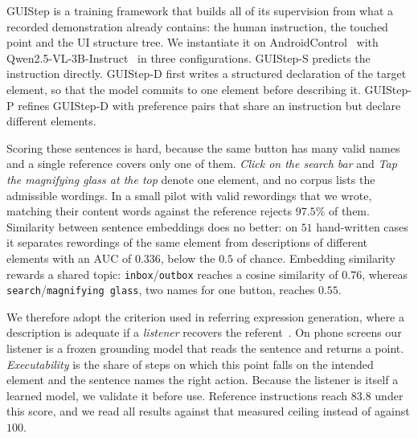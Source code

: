 \documentclass[runningheads,a4paper]{llncs}
\begin{document}
GUIStep is a training framework that builds all of its supervision from what a recorded
demonstration already contains: the human instruction, the touched point and the UI structure tree.
We instantiate it on AndroidControl~\cite{androidcontrol} with Qwen2.5-VL-3B-Instruct~\cite{qwen25vl} in three configurations. \mbox{GUIStep-S} predicts the instruction directly. \mbox{GUIStep-D} first writes a structured declaration of the target element, so that the model commits to one element before describing it. \mbox{GUIStep-P} refines \mbox{GUIStep-D} with preference pairs that share an instruction but declare different elements. 

Scoring these sentences is hard, because the same button has many valid names and a single reference covers only one of them. \emph{Click on the search bar} and \emph{Tap the magnifying glass at the top} denote
one element, and no corpus lists the admissible wordings. In a small pilot with valid rewordings that we wrote, matching their content words against the reference rejects $97.5\%$ of them. Similarity between sentence embeddings does no
better: on $51$ hand-written cases it separates rewordings of the same element from descriptions of
different elements with an AUC of $0.336$, below the $0.5$ of chance. Embedding similarity rewards a shared topic: \texttt{inbox}/\texttt{outbox} reaches a cosine similarity of $0.76$, whereas \texttt{search}/\texttt{magnifying glass}, two names for one button, reaches $0.55$.

We therefore adopt the criterion used in referring expression generation, where a description is
adequate if a \emph{listener} recovers the referent~\cite{mao2016,luo2017,yu2016}. On phone screens our listener is a frozen grounding model that reads the sentence and returns a point. \emph{Executability} is the share of steps on which this point falls on the intended element and the sentence names the right action. Because the listener is itself a learned model, we validate it before use. Reference instructions reach $83.8$ under this score, and we read all
results against that measured ceiling instead of against $100$.
\end{document}
